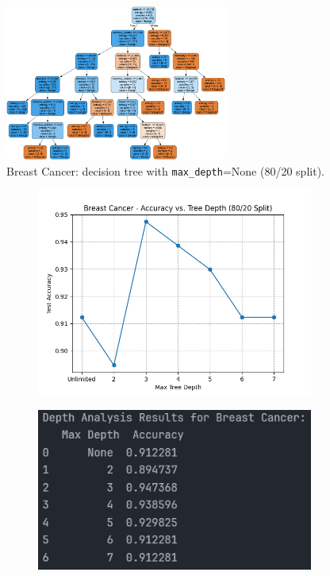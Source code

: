 \begin{figure}[H]
	\centering
	\includegraphics[width=0.65\textwidth]{imgs/dt-mini/dt__breast_cancer__80_vs_20__None.png}
	\caption{Breast Cancer: decision tree with \texttt{max\_depth}=None (80/20 split).}\label{fig:bc-dt-depth-none}
\end{figure}

\begin{figure}[H]
	\centering
	\begin{subfigure}{0.45\textwidth}
		\centering
		\includegraphics[width=\textwidth]{imgs/accuracy_vs_depth_breast_cancer.png}
	\end{subfigure}
	\hfill
	\begin{subfigure}{0.45\textwidth}
		\centering
		\includegraphics[width=\textwidth]{imgs/accuracy_vs_depth_breast_cancer__analysis.png}
	\end{subfigure}
\end{figure}

